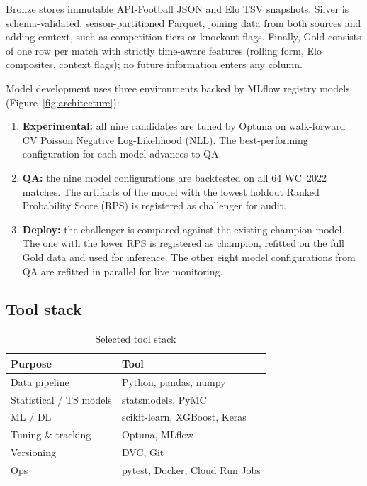 \documentclass[conference]{IEEEtran}
\begin{document}
Bronze stores immutable API-Football JSON and Elo TSV snapshots.
Silver is schema-validated, season-partitioned Parquet, joining data 
from both sources and adding context, such as competition tiers or knockout 
flags.
Finally, Gold consists of one row per match with strictly time-aware features 
(rolling form, Elo composites, context flags); no future information enters 
any column.

Model development uses three environments backed by MLflow registry models
(Figure~\ref{fig:architecture}):
\begin{enumerate}
  \item \textbf{Experimental:} all nine candidates are tuned by Optuna on 
  walk-forward CV Poisson Negative Log-Likelihood (NLL). The best-performing configuration for each
  model advances to QA.
  \item \textbf{QA:} the nine model configurations are backtested on all 64 
  WC~2022 matches. The artifacts of the model with the lowest holdout Ranked 
  Probability Score (RPS) is registered as challenger for audit.
  \item \textbf{Deploy:} the challenger is compared against the existing champion model. The one with the lower RPS is registered as champion, refitted on the full Gold data and used for inference. The other eight model configurations from QA are refitted in parallel for live monitoring.
\end{enumerate}

\subsection{Tool stack}

\begin{table}[h]
  \caption{Selected tool stack}
  \label{tab:tools}
  \begin{tabular}{@{}ll@{}}
    \toprule
    Purpose & Tool \\
    \midrule
    Data pipeline & Python, pandas, numpy \\
    Statistical / TS models & statsmodels, PyMC \\
    ML / DL & scikit-learn, XGBoost, Keras \\
    Tuning \& tracking & Optuna, MLflow \\
    Versioning & DVC, Git \\
    Ops & pytest, Docker, Cloud Run Jobs \\
    \bottomrule
  \end{tabular}
\end{table}
\end{document}
